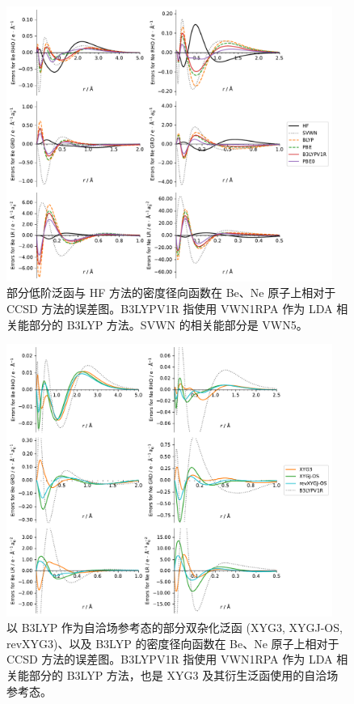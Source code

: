 \begin{figure}[hp]
    \centering
    \caption{部分低阶泛函与 HF 方法的密度径向函数在 Be、Ne 原子上相对于 CCSD 方法的误差图。B3LYPV1R 指使用 VWN1RPA 作为 LDA 相关能部分的 B3LYP 方法。SVWN 的相关能部分是 VWN5。}
    \label{fig.supp-fig-s2}
    \includegraphics[width=0.95\textwidth]{assets/supp-fig-s2.pdf}
\end{figure}

\newpage

\begin{figure}[hp]
    \centering
    \caption{以 B3LYP 作为自洽场参考态的部分双杂化泛函 (XYG3, XYGJ-OS, revXYG3)、以及 B3LYP 的密度径向函数在 Be、Ne 原子上相对于 CCSD 方法的误差图。B3LYPV1R 指使用 VWN1RPA 作为 LDA 相关能部分的 B3LYP 方法，也是 XYG3 及其衍生泛函使用的自洽场参考态。}
    \label{fig.supp-fig-s3}
    \includegraphics[width=0.95\textwidth]{assets/supp-fig-s3.pdf}
\end{figure}

